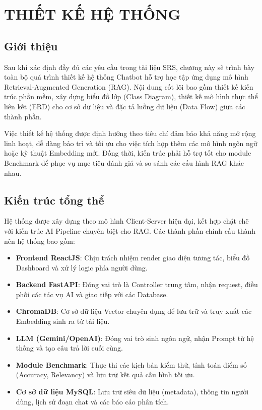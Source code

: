 \chapter{THIẾT KẾ HỆ THỐNG}

\section{Giới thiệu}

Sau khi xác định đầy đủ các yêu cầu trong tài liệu SRS, chương này sẽ trình bày toàn bộ quá trình thiết kế hệ thống Chatbot hỗ trợ học tập ứng dụng mô hình Retrieval-Augmented Generation (RAG). Nội dung cốt lõi bao gồm thiết kế kiến trúc phần mềm, xây dựng biểu đồ lớp (Class Diagram), thiết kế mô hình thực thể liên kết (ERD) cho cơ sở dữ liệu và đặc tả luồng dữ liệu (Data Flow) giữa các thành phần.

Việc thiết kế hệ thống được định hướng theo tiêu chí đảm bảo khả năng mở rộng linh hoạt, dễ dàng bảo trì và tối ưu cho việc tích hợp thêm các mô hình ngôn ngữ hoặc kỹ thuật Embedding mới. Đồng thời, kiến trúc phải hỗ trợ tốt cho module Benchmark để phục vụ mục tiêu đánh giá và so sánh các cấu hình RAG khác nhau.

\section{Kiến trúc tổng thể}

Hệ thống được xây dựng theo mô hình Client-Server hiện đại, kết hợp chặt chẽ với kiến trúc AI Pipeline chuyên biệt cho RAG. Các thành phần chính cấu thành nên hệ thống bao gồm:
\begin{itemize}
	\item \textbf{Frontend ReactJS}: Chịu trách nhiệm render giao diện tương tác, biểu đồ Dashboard và xử lý logic phía người dùng.
	\item \textbf{Backend FastAPI}: Đóng vai trò là Controller trung tâm, nhận request, điều phối các tác vụ AI và giao tiếp với các Database.
	\item \textbf{ChromaDB}: Cơ sở dữ liệu Vector chuyên dụng để lưu trữ và truy xuất các Embedding sinh ra từ tài liệu.
	\item \textbf{LLM (Gemini/OpenAI)}: Đóng vai trò sinh ngôn ngữ, nhận Prompt từ hệ thống và tạo câu trả lời cuối cùng.
	\item \textbf{Module Benchmark}: Thực thi các kịch bản kiểm thử, tính toán điểm số (Accuracy, Relevancy) và lưu trữ kết quả cấu hình tối ưu.
	\item \textbf{Cơ sở dữ liệu MySQL}: Lưu trữ siêu dữ liệu (metadata), thông tin người dùng, lịch sử đoạn chat và các báo cáo phân tích.
\end{itemize}

